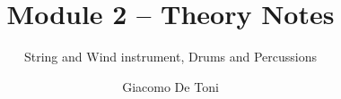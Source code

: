 \documentclass{GDTReportClass}
\title{Module 2 -- Theory Notes}  %
\subtitle{String and Wind instrument, Drums and Percussions}
\author{Giacomo De Toni}  %
\begin{document}
    \settingfrontmatter  %

    \settingmaincontent  

    
    
    
    
    
    
    
    
    
    
    
\end{document}
